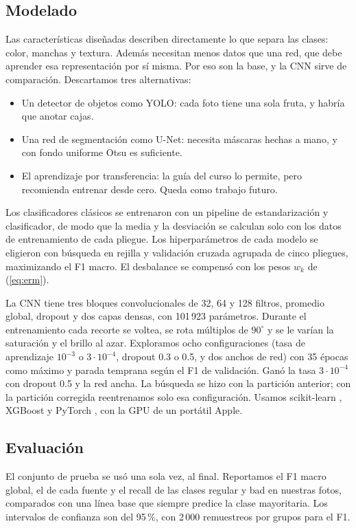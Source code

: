 \documentclass[conference]{IEEEtran}
\begin{document}
\subsection{Modelado}
Las características diseñadas describen directamente lo que separa las clases: color, manchas y textura. Además necesitan menos datos que una red, que debe aprender esa representación por sí misma. Por eso son la base, y la CNN sirve de comparación. Descartamos tres alternativas:
\begin{itemize}
\item Un detector de objetos como YOLO: cada foto tiene una sola fruta, y habría que anotar cajas.
\item Una red de segmentación como U-Net: necesita máscaras hechas a mano, y con fondo uniforme Otsu es suficiente.
\item El aprendizaje por transferencia: la guía del curso lo permite, pero recomienda entrenar desde cero. Queda como trabajo futuro.
\end{itemize}

Los clasificadores clásicos se entrenaron con un pipeline de estandarización y clasificador, de modo que la media y la desviación se calculan solo con los datos de entrenamiento de cada pliegue. Los hiperparámetros de cada modelo se eligieron con búsqueda en rejilla y validación cruzada agrupada de cinco pliegues, maximizando el F1 macro. El desbalance se compensó con los pesos $w_k$ de (\ref{eq:erm}).

La CNN tiene tres bloques convolucionales de 32, 64 y 128 filtros, promedio global, dropout y dos capas densas, con 101\,923 parámetros. Durante el entrenamiento cada recorte se voltea, se rota múltiplos de $90^\circ$ y se le varían la saturación y el brillo al azar. Exploramos ocho configuraciones (tasa de aprendizaje $10^{-3}$ o $3\cdot10^{-4}$, dropout 0.3 o 0.5, y dos anchos de red) con 35 épocas como máximo y parada temprana según el F1 de validación. Ganó la tasa $3\cdot10^{-4}$ con dropout 0.5 y la red ancha. La búsqueda se hizo con la partición anterior; con la partición corregida reentrenamos solo esa configuración. Usamos scikit-learn \cite{pedregosa2011}, XGBoost y PyTorch \cite{paszke2019}, con la GPU de un portátil Apple.

\subsection{Evaluación}
El conjunto de prueba se usó una sola vez, al final. Reportamos el F1 macro global, el de cada fuente y el recall de las clases regular y bad en nuestras fotos, comparados con una línea base que siempre predice la clase mayoritaria. Los intervalos de confianza son del 95\,\%, con 2\,000 remuestreos por grupos para el F1.
\end{document}
